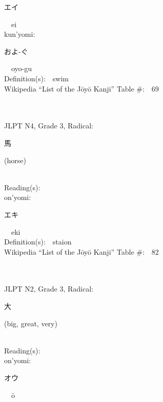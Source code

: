 \begin{multicols}{2}
{\hspace*{2em}}{\begin{CJK}{UTF8}{min} エイ \end{CJK}}\ \ ei\ \ \\
{\hspace*{1em}}kun'yomi:\ \ \\
{\hspace*{2em}}{\begin{CJK}{UTF8}{min} およ-ぐ \end{CJK}}\ \ oyo-gu\ \ \\
Definition(s):\ \ swim \\
Wikipedia ``List of the J\=oy\=o Kanji'' Table \#:\ \ 69 \\
\ \ \\
{\fontsize{34pt}{40pt}  }\ \ \\  %
{JLPT N4, Grade 3, Radical:\ \ {\begin{CJK}{UTF8}{min} 馬 \end{CJK}} (horse) } \\
Reading(s):\ \ \\
{\hspace*{1em}}on'yomi:\ \ \\
{\hspace*{2em}}{\begin{CJK}{UTF8}{min} エキ \end{CJK}}\ \ eki\ \ \\
Definition(s):\ \ staion \\
Wikipedia ``List of the J\=oy\=o Kanji'' Table \#:\ \ 82 \\
\ \ \\
{\fontsize{34pt}{40pt}  }\ \ \\  %
{JLPT N2, Grade 3, Radical:\ \ {\begin{CJK}{UTF8}{min} 大 \end{CJK}} (big, great, very) } \\
Reading(s):\ \ \\
{\hspace*{1em}}on'yomi:\ \ \\
{\hspace*{2em}}{\begin{CJK}{UTF8}{min} オウ \end{CJK}}\ \ \=o\ \ \\

\end{multicols}
